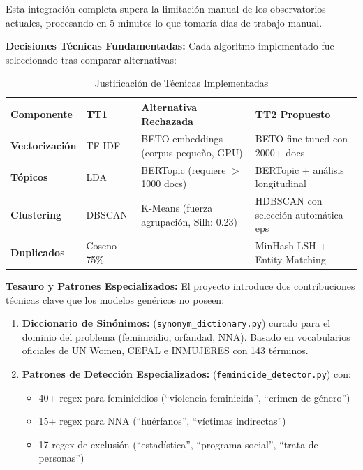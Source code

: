 Esta integración completa supera la limitación manual de los observatorios actuales, procesando en 5 minutos lo que tomaría días de trabajo manual.
    
\textbf{Decisiones Técnicas Fundamentadas:} Cada algoritmo implementado fue seleccionado tras comparar alternativas:

\begin{table}[h]
\centering
\caption{Justificación de Técnicas Implementadas}
\label{tab:justificacion_tecnicas}
\begin{tabular}{|p{3cm}|p{3cm}|p{4cm}|p{4cm}|}
\hline
\textbf{Componente} & \textbf{TT1} & \textbf{Alternativa Rechazada} & \textbf{TT2 Propuesto} \\
\hline
\textbf{Vectorización} & TF-IDF & BETO embeddings (corpus pequeño, GPU) & BETO fine-tuned con 2000+ docs \\
\hline
\textbf{Tópicos} & LDA & BERTopic (requiere $>$1000 docs) & BERTopic + análisis longitudinal \\
\hline
\textbf{Clustering} & DBSCAN & K-Means (fuerza agrupación, Silh: 0.23) & HDBSCAN con selección automática eps \\
\hline
\textbf{Duplicados} & Coseno 75\% & --- & MinHash LSH + Entity Matching \\
\hline
\end{tabular}
\end{table}

\textbf{Tesauro y Patrones Especializados:} El proyecto introduce dos contribuciones técnicas clave que los modelos genéricos no poseen:

\begin{enumerate}
    \item \textbf{Diccionario de Sinónimos:} (\texttt{synonym\_dictionary.py}) curado para el dominio del problema (feminicidio, orfandad, NNA). Basado en vocabularios oficiales de UN Women, CEPAL e INMUJERES con 143 términos.
    
    \item \textbf{Patrones de Detección Especializados:} (\texttt{feminicide\_detector.py}) con:
    \begin{itemize}
        \item 40+ regex para feminicidios (``violencia feminicida'', ``crimen de género'')
        \item 15+ regex para NNA (``huérfanos'', ``víctimas indirectas'')
        \item 17 regex de exclusión (``estadística'', ``programa social'', ``trata de personas'')
    \end{itemize}
\end{enumerate}

